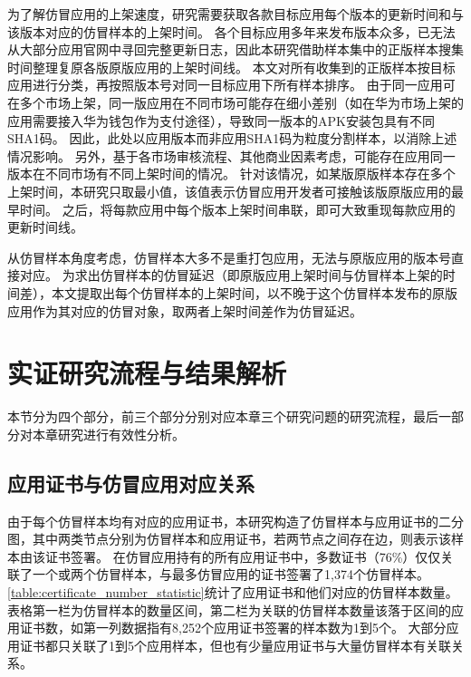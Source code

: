 为了解仿冒应用的上架速度，研究需要获取各款目标应用每个版本的更新时间和与该版本对应的仿冒样本的上架时间。
各个目标应用多年来发布版本众多，已无法从大部分应用官网中寻回完整更新日志，因此本研究借助样本集中的正版样本搜集时间整理复原各版原版应用的上架时间线。
本文对所有收集到的正版样本按目标应用进行分类，再按照版本号对同一目标应用下所有样本排序。
由于同一应用可在多个市场上架，同一版应用在不同市场可能存在细小差别（如在华为市场上架的应用需要接入华为钱包作为支付途径），导致同一版本的APK安装包具有不同SHA1码。
因此，此处以应用版本而非应用SHA1码为粒度分割样本，以消除上述情况影响。
另外，基于各市场审核流程、其他商业因素考虑，可能存在应用同一版本在不同市场有不同上架时间的情况。
针对该情况，如某版原版样本存在多个上架时间，本研究只取最小值，该值表示仿冒应用开发者可接触该版原版应用的最早时间。
之后，将每款应用中每个版本上架时间串联，即可大致重现每款应用的更新时间线。

从仿冒样本角度考虑，仿冒样本大多不是重打包应用，无法与原版应用的版本号直接对应。
为求出仿冒样本的仿冒延迟（即原版应用上架时间与仿冒样本上架的时间差），本文提取出每个仿冒样本的上架时间，以不晚于这个仿冒样本发布的原版应用作为其对应的仿冒对象，取两者上架时间差作为仿冒延迟。

\section{实证研究流程与结果解析}

本节分为四个部分，前三个部分分别对应本章三个研究问题的研究流程，最后一部分对本章研究进行有效性分析。

\subsection{应用证书与仿冒应用对应关系}


由于每个仿冒样本均有对应的应用证书，本研究构造了仿冒样本与应用证书的二分图，其中两类节点分别为仿冒样本和应用证书，若两节点之间存在边，则表示该样本由该证书签署。
在仿冒应用持有的所有应用证书中，多数证书（76\%）仅仅关联了一个或两个仿冒样本，与最多仿冒应用的证书签署了1,374个仿冒样本。
\autoref{table:certificate_number_statistic}统计了应用证书和他们对应的仿冒样本数量。
表格第一栏为仿冒样本的数量区间，第二栏为关联的仿冒样本数量该落于区间的应用证书数，如第一列数据指有8,252个应用证书签署的样本数为1到5个。
大部分应用证书都只关联了1到5个应用样本，但也有少量应用证书与大量仿冒样本有关联关系。

